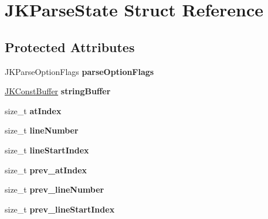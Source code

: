 \hypertarget{struct_j_k_parse_state}{\section{J\+K\+Parse\+State Struct Reference}
\label{struct_j_k_parse_state}
}
\subsection*{Protected Attributes}
\begin{DoxyCompactItemize}
\item 
\hypertarget{struct_j_k_parse_state_a1f3490e9a09b5b8a3e6da9acbf931dc6}{J\+K\+Parse\+Option\+Flags {\bfseries parse\+Option\+Flags}}\label{struct_j_k_parse_state_a1f3490e9a09b5b8a3e6da9acbf931dc6}

\item 
\hypertarget{struct_j_k_parse_state_ac4058997292d1db6df9a98fdad4490c6}{\hyperlink{struct_j_k_const_buffer}{J\+K\+Const\+Buffer} {\bfseries string\+Buffer}}\label{struct_j_k_parse_state_ac4058997292d1db6df9a98fdad4490c6}

\item 
\hypertarget{struct_j_k_parse_state_a76a9ba58b3d6d6cf0c4c14bbd4504c06}{size\+\_\+t {\bfseries at\+Index}}\label{struct_j_k_parse_state_a76a9ba58b3d6d6cf0c4c14bbd4504c06}

\item 
\hypertarget{struct_j_k_parse_state_ac3782de601b30a5b130bf0cdac9ad8da}{size\+\_\+t {\bfseries line\+Number}}\label{struct_j_k_parse_state_ac3782de601b30a5b130bf0cdac9ad8da}

\item 
\hypertarget{struct_j_k_parse_state_a20c602b9dcd7a8c97188f52a139f20cc}{size\+\_\+t {\bfseries line\+Start\+Index}}\label{struct_j_k_parse_state_a20c602b9dcd7a8c97188f52a139f20cc}

\item 
\hypertarget{struct_j_k_parse_state_aba55775f625aafeb9cd2e10283c7a9c2}{size\+\_\+t {\bfseries prev\+\_\+at\+Index}}\label{struct_j_k_parse_state_aba55775f625aafeb9cd2e10283c7a9c2}

\item 
\hypertarget{struct_j_k_parse_state_ae437d0653063a9138624c6583959317d}{size\+\_\+t {\bfseries prev\+\_\+line\+Number}}\label{struct_j_k_parse_state_ae437d0653063a9138624c6583959317d}

\item 
\hypertarget{struct_j_k_parse_state_aa7cb604a31c86b51cf1fb63eab1bbb3c}{size\+\_\+t {\bfseries prev\+\_\+line\+Start\+Index}}\label{struct_j_k_parse_state_aa7cb604a31c86b51cf1fb63eab1bbb3c}


\end{DoxyCompactItemize}
